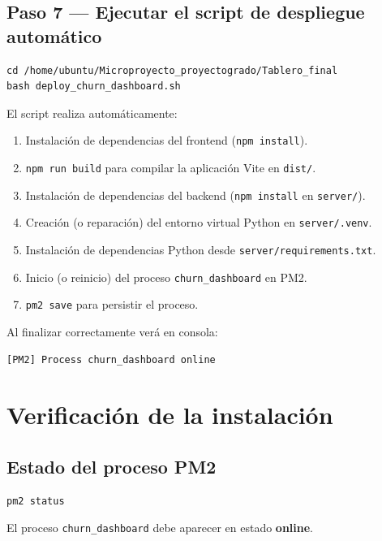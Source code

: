\documentclass[11pt]{article}
\begin{document}
\subsection{Paso 7 — Ejecutar el script de despliegue automático}

\begin{lstlisting}
cd /home/ubuntu/Microproyecto_proyectogrado/Tablero_final
bash deploy_churn_dashboard.sh
\end{lstlisting}

El script realiza automáticamente:

\begin{enumerate}[itemsep=2pt]
  \item Instalación de dependencias del frontend (\texttt{npm install}).
  \item \texttt{npm run build} para compilar la aplicación Vite en \texttt{dist/}.
  \item Instalación de dependencias del backend (\texttt{npm install} en
        \texttt{server/}).
  \item Creación (o reparación) del entorno virtual Python en
        \texttt{server/.venv}.
  \item Instalación de dependencias Python desde
        \texttt{server/requirements.txt}.
  \item Inicio (o reinicio) del proceso \texttt{churn\_dashboard} en PM2.
  \item \texttt{pm2 save} para persistir el proceso.
\end{enumerate}

Al finalizar correctamente verá en consola:

\begin{lstlisting}
[PM2] Process churn_dashboard online
\end{lstlisting}

\section{Verificación de la instalación}

\subsection{Estado del proceso PM2}

\begin{lstlisting}
pm2 status
\end{lstlisting}

El proceso \texttt{churn\_dashboard} debe aparecer en estado \textbf{online}.
\end{document}
